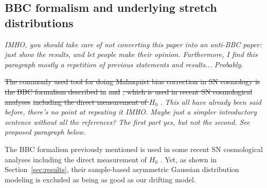 \documentclass[]{aa} %
\newcommand{\nn}[1]{{\textcolor[rgb]{0.25, 0.50, 0}{#1}}}
\newcommand{\yc}[1]{{\textcolor{BrickRed}{#1}}}
\begin{document}
\subsection{BBC formalism and underlying stretch distributions}\label{sec:bbc}

\yc{\textit{IMHO, you should take care of not converting this paper into an
anti-BBC paper: just show the results, and let people make their opinion.
Furthermore, I find this paragraph mostly a repetition of previous statements
and results...}} \nn{\textit{Probably.}} \bigbreak

\sout{The commonly used tool for doing Malmquist bias correction in SN cosmology
is the BBC formalism described in} \cite{scolnic2016}\sout{ and}
\cite{kessler2017}\sout{, which is used in recent SN cosmological analyses}
\citep{jones2018b, scolnic2018a, brout2019, descosmopaper2019}
\sout{including the direct measurement of $H_0$} \citep{riess2016,
riess2019}. \yc{\textit{This all have already been said before, there's
no point at repeating it IMHO. Maybe just a simpler introductory
sentence without all the references?}} \nn{\textit{The first part yes, but
not the second. See proposed paragraph below.}} \bigbreak

\nn{The BBC formalism previously mentioned is used in some recent SN
cosmological analyses \citep{jones2018b, scolnic2018a, brout2019,
descosmopaper2019} including the direct measurement of $H_0$
\citep{riess2016, riess2019}. Yet, as shown in Section~\ref{sec:results},
their sample-based asymmetric Gaussian distribution modeling is excluded as
being as good as our drifting model.}
\end{document}
